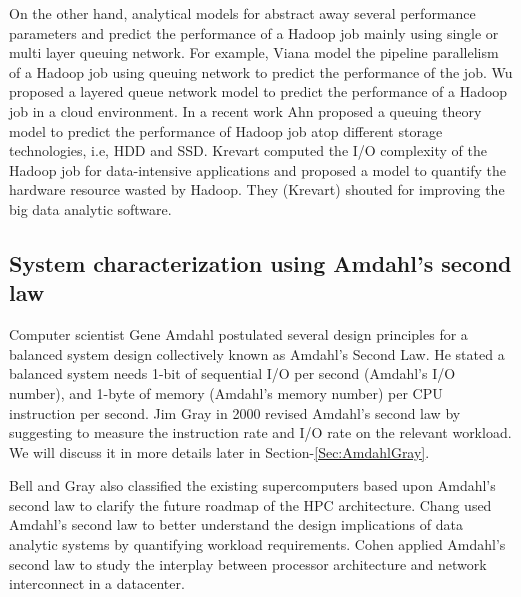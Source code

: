 \documentclass[journal]{IEEEtran}
\begin{document}
On the other hand, analytical models for abstract away several performance parameters and predict the performance of a Hadoop job mainly using single or multi layer queuing network. For example, Viana \cite{Model:vianna2013analytical} model the pipeline parallelism of a Hadoop job using queuing network to predict the performance of the job.  Wu \cite{Model:wu2015exploring} proposed a layered queue network model to predict the performance of a Hadoop job in a cloud environment. In a recent work Ahn \cite{Model:ahn2015analytical} proposed a queuing theory model to predict the performance of Hadoop job atop different storage technologies, i.e, HDD and SSD. Krevart \cite{Model:krevat2010applying} computed the I/O complexity of the Hadoop job for data-intensive applications and proposed a model to quantify the hardware resource wasted by Hadoop.  They (Krevart) shouted for improving the big data analytic software.

\subsection{System characterization using Amdahl's second law }
Computer scientist Gene Amdahl postulated several design principles for a balanced system design collectively known as Amdahl's Second Law. He stated a balanced system needs 1-bit of sequential I/O per second (Amdahl's I/O number), and 1-byte of memory (Amdahl's memory number) per CPU instruction per second. Jim Gray \cite{Amdahl:RuleofThumbgray2000rules} in 2000 revised Amdahl's second law by suggesting to measure the instruction rate and I/O rate on the relevant workload. We will discuss it in more details later in Section-\ref{Sec:AmdahlGray}.

Bell and Gray \cite{Amdahl:PetascaleBell2005petascale} also classified the existing supercomputers based upon Amdahl's second law to clarify the future roadmap of the HPC architecture. Chang  \cite{Amdahl:Workloadchang} used Amdahl's second law to better understand the design implications of data analytic systems by quantifying workload requirements.  Cohen \cite{Balance:cohen2009applying} applied Amdahl’s second law to study the interplay between processor architecture and network interconnect in a datacenter. 
\end{document}
